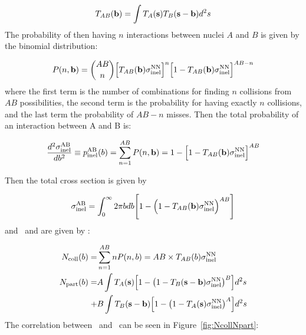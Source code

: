 \begin{align}
T_{AB}({\bf b}) = \int T_{A} ({\bf s}) T_{B} ({\bf s-\bf b}) d^2 s
\end{align}
The probability of then having $n$ interactions between nuclei $A$ and $B$ is given by the binomial distribution:

\begin{align}
P(n, { \bf b}) = {{AB} \choose {n}} \Big[T_{AB}( {\bf b} ) \sigma_{\mathrm{inel}}^{\mathrm{NN}} \Big]^n \Big[ 1 - T_{AB}( {\bf b} ) \sigma_{\mathrm{inel}}^{\mathrm{NN}} \Big]^{AB-n}
\end{align}
where the first term is the number of combinations for finding $n$ collisions from $AB$ possibilities, the second term is the probability for having exactly $n$ collisions, and the last term the probability of $AB-n$ misses.
Then the total probability of an interaction between A and B is:

\begin{align}
\frac{d^2  \sigma_{\mathrm{inel}}^{\mathrm{AB}} }{db^2} \equiv p_{\mathrm{inel}}^{\mathrm{AB}} (b) = \sum_{n=1}^{AB} P(n, {\bf b}) = 1- \Big[ 1 - T_{AB}( {\bf b} ) \sigma_{\mathrm{inel}}^{\mathrm{NN}} \Big]^{AB}
\end{align}

Then the total cross section is given by

\begin{align}
\sigma_{\mathrm{inel}}^{\mathrm{AB}} = \int_0^\infty 2\pi b db \Bigg[ 1- \Big( 1 - T_{AB}( {\bf b} ) \sigma_{\mathrm{inel}}^{\mathrm{NN}}  \Big)^{AB} \Bigg]
\end{align}
and \Ncoll\ and \Npart are given by \cite{Kharzeev:2000ph, Bialas:1976ed}:

\begin{align}
\mbox{$N_{\mathrm{coll}}$} (b) = & \sum_{n=1}^{AB} n P(n, b) =  AB \times T_{AB}(b) \sigma_{\mathrm{inel}}^{\mathrm{NN}} \\
\mbox{$N_{\mathrm{part}}$} (b) = & A \int T_A ({\bf s}) \Big[ 1 - \big(1-T_B ({\bf s - b}) \sigma_{\mathrm{inel}}^{\mathrm{NN}} \big)^B \Big] d^2 s \\
+ & B \int T_B ({\bf s-b}) \Big[ 1 - \big(1-T_A ({\bf s}) \sigma_{\mathrm{inel}}^{\mathrm{NN}} \big)^A \Big] d^2 s \nonumber
\end{align}
The correlation between \Ncoll\ and \Npart\ can be seen in Figure~\ref{fig:NcollNpart}:

